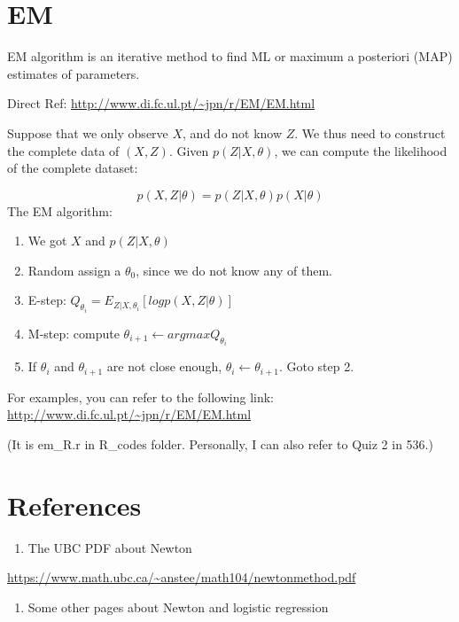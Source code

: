 \documentclass[]{book}
\providecommand{\tightlist}{%
  \setlength{\itemsep}{0pt}\setlength{\parskip}{0pt}}
\begin{document}
\section{EM}\label{em}

EM algorithm is an iterative method to find ML or maximum a posteriori
(MAP) estimates of parameters.

Direct Ref: \url{http://www.di.fc.ul.pt/~jpn/r/EM/EM.html}

Suppose that we only observe \(X\), and do not know \(Z\). We thus need
to construct the complete data of \((X, Z)\). Given \(p(Z|X,\theta)\),
we can compute the likelihood of the complete dataset:

\[p(X, Z|\theta)=p(Z|X,\theta)p(X|\theta)\] The EM algorithm:

\begin{enumerate}
\def\labelenumi{(\arabic{enumi})}
\setcounter{enumi}{-1}
\item
  We got \(X\) and \(p(Z|X,\theta)\)
\item
  Random assign a \(\theta_0\), since we do not know any of them.
\item
  E-step: \(Q_{\theta_i} = E_{Z|X,\theta_i}[log p(X,Z|\theta)]\)
\item
  M-step: compute \(\theta_{i+1} \leftarrow argmax Q_{\theta_i}\)
\item
  If \(\theta_i\) and \(\theta_{i+1}\) are not close enough,
  \(\theta_i \leftarrow \theta_{i+1}\). Goto step 2.
\end{enumerate}

For examples, you can refer to the following link:
\url{http://www.di.fc.ul.pt/~jpn/r/EM/EM.html}

(It is em\_R.r in R\_codes folder. Personally, I can also refer to Quiz
2 in 536.)

\section{References}\label{references-2}

\begin{enumerate}
\def\labelenumi{\arabic{enumi}.}
\tightlist
\item
  The UBC PDF about Newton
\end{enumerate}

\url{https://www.math.ubc.ca/~anstee/math104/newtonmethod.pdf}

\begin{enumerate}
\def\labelenumi{\arabic{enumi}.}
\setcounter{enumi}{1}
\tightlist
\item
  Some other pages about Newton and logistic regression
\end{enumerate}
\end{document}
